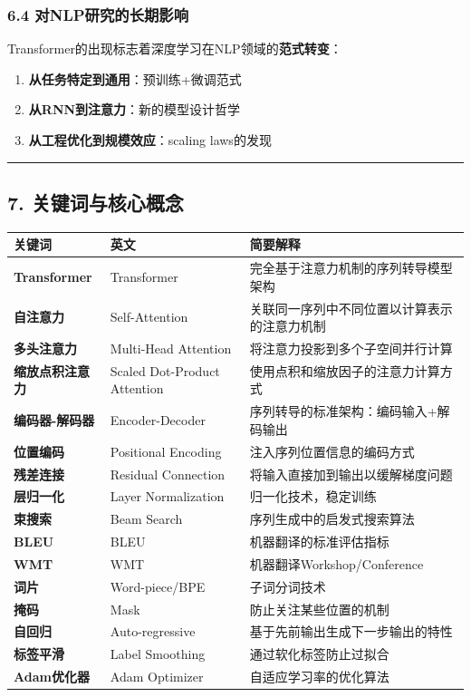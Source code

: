 \documentclass[11pt,a4paper]{article}
\begin{document}
\subsubsection*{6.4 对NLP研究的长期影响}

Transformer的出现标志着深度学习在NLP领域的\textbf{范式转变}：

\begin{enumerate}
  \item \textbf{从任务特定到通用}：预训练+微调范式
  \item \textbf{从RNN到注意力}：新的模型设计哲学
  \item \textbf{从工程优化到规模效应}：scaling laws的发现
\end{enumerate}

\vspace{0.5em}\noindent\rule{\textwidth}{0.4pt}\vspace{0.5em}

\subsection*{7. 关键词与核心概念}

\begin{center}
\begin{tabular}{|l|l|l|}
\hline
关键词 & 英文 & 简要解释 \\
\hline
\textbf{Transformer} & Transformer & 完全基于注意力机制的序列转导模型架构 \\
\hline
\textbf{自注意力} & Self-Attention & 关联同一序列中不同位置以计算表示的注意力机制 \\
\hline
\textbf{多头注意力} & Multi-Head Attention & 将注意力投影到多个子空间并行计算 \\
\hline
\textbf{缩放点积注意力} & Scaled Dot-Product Attention & 使用点积和缩放因子的注意力计算方式 \\
\hline
\textbf{编码器-解码器} & Encoder-Decoder & 序列转导的标准架构：编码输入+解码输出 \\
\hline
\textbf{位置编码} & Positional Encoding & 注入序列位置信息的编码方式 \\
\hline
\textbf{残差连接} & Residual Connection & 将输入直接加到输出以缓解梯度问题 \\
\hline
\textbf{层归一化} & Layer Normalization & 归一化技术，稳定训练 \\
\hline
\textbf{束搜索} & Beam Search & 序列生成中的启发式搜索算法 \\
\hline
\textbf{BLEU} & BLEU & 机器翻译的标准评估指标 \\
\hline
\textbf{WMT} & WMT & 机器翻译Workshop/Conference \\
\hline
\textbf{词片} & Word-piece/BPE & 子词分词技术 \\
\hline
\textbf{掩码} & Mask & 防止关注某些位置的机制 \\
\hline
\textbf{自回归} & Auto-regressive & 基于先前输出生成下一步输出的特性 \\
\hline
\textbf{标签平滑} & Label Smoothing & 通过软化标签防止过拟合 \\
\hline
\textbf{Adam优化器} & Adam Optimizer & 自适应学习率的优化算法 \\
\hline
\end{tabular}
\end{center}
\end{document}
